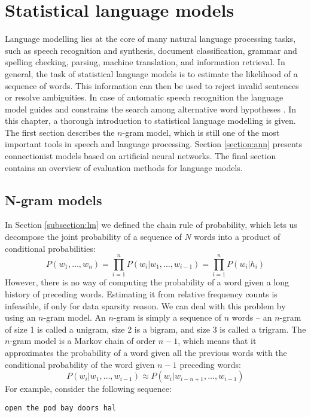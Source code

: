 \chapter{Statistical language models}
\label{chapter:lm}
Language modelling lies at the core of many natural language processing tasks, such as speech recognition and synthesis, document classification, grammar and spelling checking, parsing, machine translation, and information retrieval. In general, the task of statistical language models is to estimate the likelihood of a sequence of words. This information can then be used to reject invalid sentences or resolve ambiguities. In case of automatic speech recognition the language model guides and constrains the search among alternative word hypotheses \cite{glass2013automatic}.
In this chapter, a thorough introduction to statistical language modelling is given. The first section describes the $n$-gram model, which is still one of the most important tools in speech and language processing. Section \ref{section:ann} presents connectionist models based on artificial neural networks. The final section contains an overview of evaluation methods for language models.
\section{N-gram models}
\label{section:ngrams}
In Section \ref{subsection:lm} we defined the chain rule of probability, which lets us decompose the joint probability of a sequence of $N$ words into a product of conditional probabilities:
\begin{equation}
	P(w_{1}, \dots, w_{n})=\prod_{i=1}^{n}P(w_{i}|w_{1},\dots,w_{i-1})=\prod_{i=1}^{n}P(w_{i}|h_{i})
\end{equation}
However, there is no way of computing the probability of a word given a long history of preceding words. Estimating it from relative frequency counts is infeasible, if only for data sparsity reason. We can deal with this problem by using an $n$-gram model. An $n$-gram is simply a sequence of $n$ words -- an $n$-gram of size 1 is called a unigram, size 2 is a bigram, and size 3 is called a trigram. The $n$-gram model is a Markov chain of order $n-1$, which means that it approximates the probability of a word given all the previous words with the conditional probability of the word given $n-1$ preceding words:
\begin{equation}
	P(w_{i}|w_{1},\dots,w_{i-1})\approx P(w_{i}|w_{i-n+1},\dots,w_{i-1})
\end{equation}
For example, consider the following sequence:
\begin{center}
\texttt{open the pod bay doors hal}  
\end{center}
